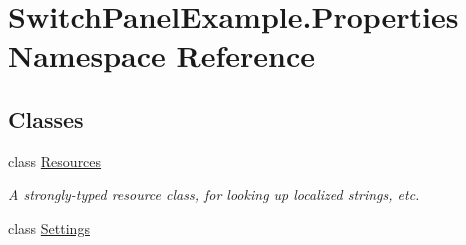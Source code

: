 \hypertarget{namespace_switch_panel_example_1_1_properties}{}\section{Switch\+Panel\+Example.\+Properties Namespace Reference}
\label{namespace_switch_panel_example_1_1_properties}
\subsection*{Classes}
\begin{DoxyCompactItemize}
\item 
class \mbox{\hyperlink{class_switch_panel_example_1_1_properties_1_1_resources}{Resources}}
\begin{DoxyCompactList}\small\item\em A strongly-\/typed resource class, for looking up localized strings, etc. \end{DoxyCompactList}\item 
class \mbox{\hyperlink{class_switch_panel_example_1_1_properties_1_1_settings}{Settings}}
\end{DoxyCompactItemize}
